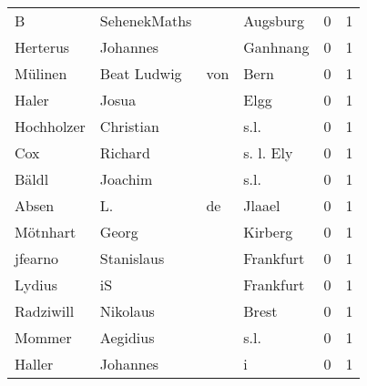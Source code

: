 \documentclass[10pt,a4paper,landscape]{article}
\begin{document}
\begin{longtable}{llllrr}
                        B &                       SehenekMaths &             &                                    Augsburg &          0 &         1 \\
                 Herterus &                           Johannes &             &                                    Ganhnang &          0 &         1 \\
                  Mülinen &                        Beat Ludwig &         von &                                        Bern &          0 &         1 \\
                    Haler &                              Josua &             &                                        Elgg &          0 &         1 \\
               Hochholzer &                          Christian &             &                                        s.l. &          0 &         1 \\
                      Cox &                            Richard &             &                                   s. l. Ely &          0 &         1 \\
                    Bäldl &                            Joachim &             &                                        s.l. &          0 &         1 \\
                    Absen &                                 L. &          de &                                      Jlaael &          0 &         1 \\
                 Mötnhart &                              Georg &             &                                     Kirberg &          0 &         1 \\
                  jfearno &                         Stanislaus &             &                                   Frankfurt &          0 &         1 \\
                   Lydius &                                 iS &             &                                   Frankfurt &          0 &         1 \\
                Radziwill &                           Nikolaus &             &                                       Brest &          0 &         1 \\
                   Mommer &                           Aegidius &             &                                        s.l. &          0 &         1 \\
                   Haller &                           Johannes &             &                                           i &          0 &         1 \\

\end{longtable}
\end{document}
